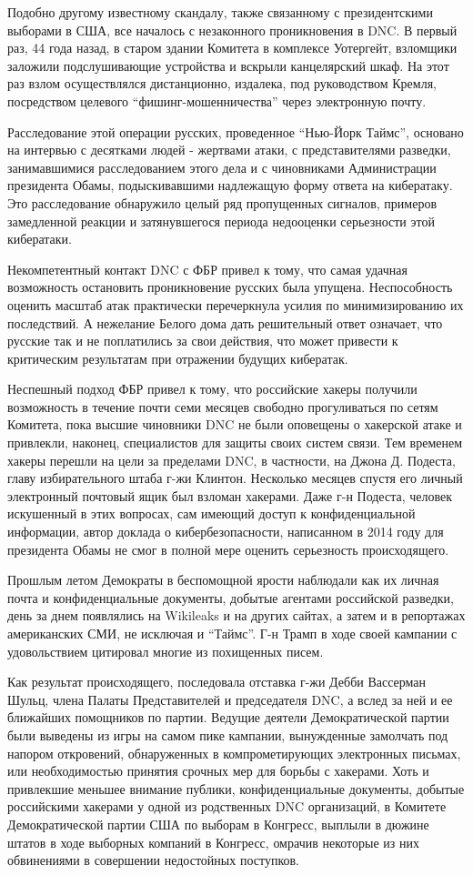 Подобно другому известному скандалу, также связанному с президентскими
выборами в США, все началось с незаконного проникновения в DNC. В первый
раз, 44 года назад, в старом здании Комитета в комплексе Уотергейт,
взломщики заложили подслушивающие устройства и вскрыли канцелярский
шкаф. На этот раз взлом осуществлялся дистанционно, издалека, под
руководством Кремля, посредством целевого ``фишинг-мошенничества'' через
электронную почту.

Расследование этой операции русских, проведенное ``Нью-Йорк Таймс'',
основано на интервью с десятками людей - жертвами атаки, с
представителями разведки, занимавшимися расследованием этого дела и с
чиновниками Администрации президента Обамы, подыскивавшими надлежащую
форму ответа на кибератаку. Это расследование обнаружило целый ряд
пропущенных сигналов, примеров замедленной реакции и затянувшегося
периода недооценки серьезности этой кибератаки.

Некомпетентный контакт DNC с ФБР привел к тому, что самая удачная
возможность остановить проникновение русских была упущена. Неспособность
оценить масштаб атак практически перечеркнула усилия по минимизированию
их последствий. А нежелание Белого дома дать решительный ответ означает,
что русские так и не поплатились за свои действия, что может привести к
критическим результатам при отражении будущих кибератак.

Неспешный подход ФБР привел к тому, что российские хакеры получили
возможность в течение почти семи месяцев свободно прогуливаться по сетям
Комитета, пока высшие чиновники DNC не были оповещены о хакерской атаке
и привлекли, наконец, специалистов для защиты своих систем связи. Тем
временем хакеры перешли на цели за пределами DNC, в частности, на Джона
Д. Подеста, главу избирательного штаба г-жи Клинтон. Несколько месяцев
спустя его личный электронный почтовый ящик был взломан хакерами. Даже
г-н Подеста, человек искушенный в этих вопросах, сам имеющий доступ к
конфиденциальной информации, автор доклада о кибербезопасности,
написанном в 2014 году для президента Обамы не смог в полной мере
оценить серьезность происходящего.

Прошлым летом Демократы в беспомощной ярости наблюдали как их личная
почта и конфиденциальные документы, добытые агентами российской
разведки, день за днем появлялись на Wikileaks и на других сайтах, а
затем и в репортажах американских СМИ, не исключая и ``Таймс''. Г-н
Трамп в ходе своей кампании с удовольствием цитировал многие из
похищенных писем.

Как результат происходящего, последовала отставка г-жи Дебби Вассерман
Шульц, члена Палаты Представителей и председателя DNC, а вслед за ней и
ее ближайших помощников по партии. Ведущие деятели Демократической
партии были выведены из игры на самом пике кампании, вынужденные
замолчать под напором откровений, обнаруженных в компрометирующих
электронных письмах, или необходимостью принятия срочных мер для борьбы
с хакерами. Хоть и привлекшие меньшее внимание публики, конфиденциальные
документы, добытые российскими хакерами у одной из родственных DNC
организаций, в Комитете Демократической партии США по выборам в
Конгресс, выплыли в дюжине штатов в ходе выборных компаний в Конгресс,
омрачив некоторые из них обвинениями в совершении недостойных поступков.

